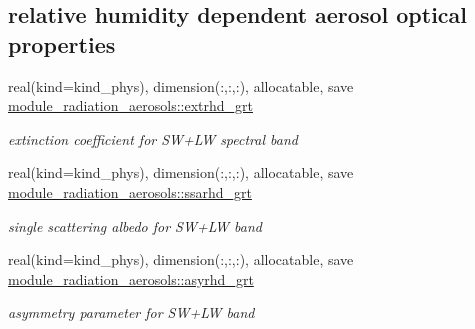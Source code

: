 \subsection*{relative humidity dependent aerosol optical properties}
\begin{DoxyCompactItemize}
\item 
\mbox{\label{group__module__radiation__aerosols_ga07bfe1ada075519d1d3ceabe21b65a96}} 
real(kind=kind\+\_\+phys), dimension(\+:,\+:,\+:), allocatable, save \hyperlink{group__module__radiation__aerosols_ga07bfe1ada075519d1d3ceabe21b65a96}{module\+\_\+radiation\+\_\+aerosols\+::extrhd\+\_\+grt}
\begin{DoxyCompactList}\small\item\em extinction coefficient for S\+W+\+LW spectral band \end{DoxyCompactList}\item 
\mbox{\label{group__module__radiation__aerosols_ga4aa91ab1d0b9d71c704dc565ef4704bf}} 
real(kind=kind\+\_\+phys), dimension(\+:,\+:,\+:), allocatable, save \hyperlink{group__module__radiation__aerosols_ga4aa91ab1d0b9d71c704dc565ef4704bf}{module\+\_\+radiation\+\_\+aerosols\+::ssarhd\+\_\+grt}
\begin{DoxyCompactList}\small\item\em single scattering albedo for S\+W+\+LW band \end{DoxyCompactList}\item 
\mbox{\label{group__module__radiation__aerosols_ga2da45b8bd425415ca417f6590cc54da6}} 
real(kind=kind\+\_\+phys), dimension(\+:,\+:,\+:), allocatable, save \hyperlink{group__module__radiation__aerosols_ga2da45b8bd425415ca417f6590cc54da6}{module\+\_\+radiation\+\_\+aerosols\+::asyrhd\+\_\+grt}
\begin{DoxyCompactList}\small\item\em asymmetry parameter for S\+W+\+LW band \end{DoxyCompactList}\end{DoxyCompactItemize}
